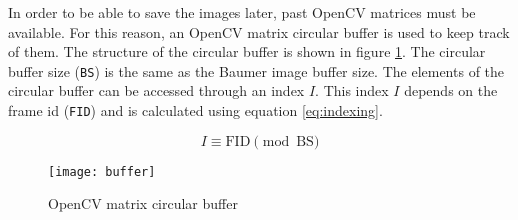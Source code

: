 In order to be able to save the images later, past OpenCV matrices must be available.
For this reason, an OpenCV matrix circular buffer is used to keep track of them.
The structure of the circular buffer is shown in figure \ref{fig:circular_buffer}.
The circular buffer size (\texttt{BS}) is the same as the Baumer image buffer size.
The elements of the circular buffer can be accessed through an index $I$.
This index $I$ depends on the frame id (\texttt{FID}) and is calculated using equation \ref{eq:indexing}.

\begin{equation}
  I \equiv \text{FID} \pmod{\text{BS}}
  \label{eq:indexing}
\end{equation}

\begin{figure}[h]
  \centering
  \texttt{[image: buffer]}
  \caption{OpenCV matrix circular buffer}
  \label{fig:circular_buffer}
\end{figure}


